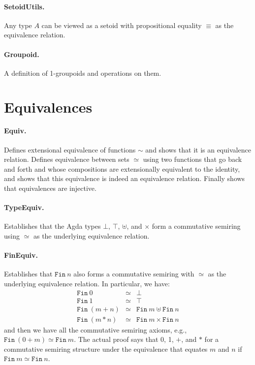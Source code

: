 \documentclass{article}
\begin{document}
\paragraph*{SetoidUtils.} Any type $A$ can be viewed as a setoid with propositional equality $\equiv$ as the equivalence relation.

\paragraph*{Groupoid.} A definition of 1-groupoids and operations on them.

\section{Equivalences} 

\paragraph*{Equiv.} Defines extensional equivalence of functions $\sim$ and shows that it is an equivalence relation. Defines equivalence between sets $\simeq$ using two functions that go back and forth and whose compositions are extensionally equivalent to the identity, and shows that this equivalence is indeed an equivalence relation. Finally shows that equivalences are injective.

\paragraph*{TypeEquiv.} Establishes that the Agda types $\bot$, $\top$, $\uplus$, and $\times$ form a commutative semiring using $\simeq$ as the underlying equivalence relation.

\paragraph*{FinEquiv.} Establishes that $\texttt{Fin}~n$ also forms a commutative semiring with $\simeq$ as the underlying equivalence relation. In particular, we have:
\[\begin{array}{rcll}
\texttt{Fin}~0 &\simeq& \bot \\
\texttt{Fin}~1 &\simeq& \top \\
\texttt{Fin}~(m+n) &\simeq& \texttt{Fin}~m \uplus \texttt{Fin}~n \\
\texttt{Fin}~(m*n) &\simeq& \texttt{Fin}~m \times \texttt{Fin}~n
\end{array}\]
and then we have all the commutative semiring axioms, e.g.,
$\texttt{Fin}~(0+m) \simeq \texttt{Fin}~m$. The actual proof says that
0, 1, $+$, and $*$ for a commutative semiring structure under the
equivalence that equates $m$ and $n$ if $\texttt{Fin}~m \simeq \texttt{Fin}~n$.
\end{document}

